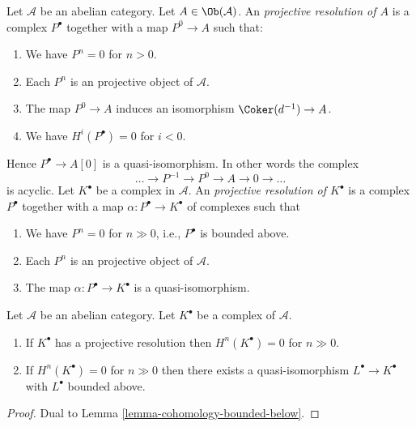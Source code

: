 \begin{definition}
\label{definition-projective-resolution}
Let $\mathcal{A}$ be an abelian category.
Let $A \in \Ob(\mathcal{A})$.
An {\it projective resolution of $A$} is a complex
$P^\bullet$ together with a map $P^0 \to A$ such
that:
\begin{enumerate}
\item We have $P^n = 0$ for $n > 0$.
\item Each $P^n$ is an projective object of $\mathcal{A}$.
\item The map $P^0 \to A$ induces an isomorphism $\Coker(d^{-1}) \to A$.
\item We have $H^i(P^\bullet) = 0$ for $i < 0$.
\end{enumerate}
Hence $P^\bullet \to A[0]$ is a quasi-isomorphism.
In other words the complex
$$
\ldots \to P^{-1} \to P^0 \to A \to 0 \to \ldots
$$
is acyclic. Let $K^\bullet$ be a complex in $\mathcal{A}$.
An {\it projective resolution of $K^\bullet$} is a complex
$P^\bullet$ together with a map $\alpha : P^\bullet \to K^\bullet$
of complexes such that
\begin{enumerate}
\item We have $P^n = 0$ for $n \gg 0$, i.e., $P^\bullet$ is bounded above.
\item Each $P^n$ is an projective object of $\mathcal{A}$.
\item The map $\alpha : P^\bullet \to K^\bullet$ is a
quasi-isomorphism.
\end{enumerate}
\end{definition}

\begin{lemma}
\label{lemma-cohomology-bounded-above}
Let $\mathcal{A}$ be an abelian category.
Let $K^\bullet$ be a complex of $\mathcal{A}$.
\begin{enumerate}
\item If $K^\bullet$ has a projective resolution then
$H^n(K^\bullet) = 0$ for $n \gg 0$.
\item If $H^n(K^\bullet) = 0$ for $n \gg 0$ then there
exists a quasi-isomorphism $L^\bullet \to K^\bullet$
with $L^\bullet$ bounded above.
\end{enumerate}
\end{lemma}

\begin{proof}
Dual to
Lemma \ref{lemma-cohomology-bounded-below}.
\end{proof}

